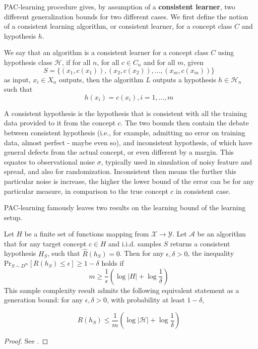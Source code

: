 \documentclass[10pt]{article} %
\begin{document}
PAC-learning procedure gives, by assumption of a \textbf{consistent learner}, two different generalization bounds for two different cases. We first define the notion of a consistent learning algorithm, or consistent learner, for a concept class $C$ and hypothesis $h$. 
{
    \small
    \begin{definition}
    We say that an algorithm is a consistent learner for a concept class $C$ using hypothesis class $\mathcal{H}$, if for all $n$, for all $c\in C_n$ and for all $m$, given 
    \begin{equation*}
        S = \{ (x_1, c(x_1)) , (x_2, c(x_2)) ,\dots, (x_m, c(x_m))  \} 
    \end{equation*}
    as input, $x_i \in X_n$ outputs, then the algorithm $L$ outputs a hypothesis $h\in \mathcal{H}_n$ such that $$h(x_i) = c(x_i) , i = 1,\dots,m$$ 
    \end{definition}
}
A consistent hypothesis is the hypothesis that is consistent with all the training data provided to it from the concept $c$. The two bounds then contain the debate between consistent hypothesis (i.e., for example, admitting no error on training data, almost perfect - maybe even so), and inconsistent hypothesis, of which have general defects from the actual concept, or even different by a margin. This equates to observational noise $\sigma$, typically used in simulation of noisy feature and spread, and also for randomization. Inconsistent then means the further this particular noise is increase, the higher the lower bound of the error can be for any particular measure, in comparison to the true concept $c$ in consistent case. 

PAC-learning famously leaves two results on the learning bound of the learning setup. 
\begin{theorem}
    Let $H$ be a finite set of functions mapping from $\mathcal{X}\to \mathcal{Y}$. Let $\mathcal{A}$ be an algorithm that for any target concept $c\in H$ and i.i.d. samples $S$ returns a consistent hypothesis $H_{S}$, such that $\hat{R}(h_{S}) = 0$. Then for any  $\epsilon,\delta>0$, the inequality $\mathrm{Pr}_{S\sim D^{m}}[R(h_{S})\leq \epsilon]\geq 1-\delta$ holds if $$m\geq \frac{1}{\epsilon}\left( \log{\lvert H \rvert }+\log{\frac{1}{\delta}} \right)$$
This sample complexity result admits the following equivalent statement as a generation bound: for any $\epsilon,\delta>0$, with probability at least $1-\delta$, 

\begin{equation}
    R(h_S) \leq \frac{1}{m} \left( \log{|\mathcal{H}|} + \log{\frac{1}{\delta}} \right)
\end{equation}
\end{theorem}
\begin{proof}
    See \cite{10.5555/2371238}.
\end{proof}
\end{document}
